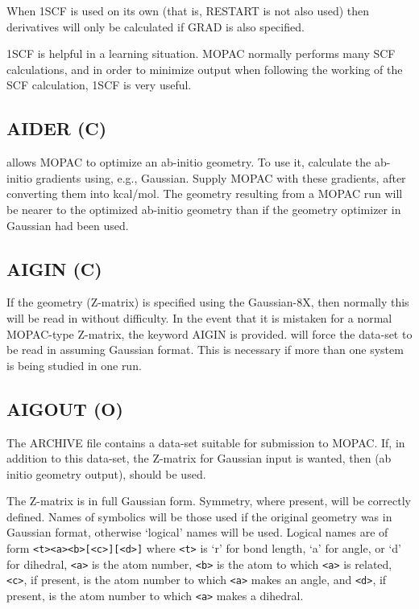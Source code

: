       When 1SCF is used on its own (that is, RESTART  is  not  also  used)
 then derivatives will only be calculated if GRAD is also specified.

      1SCF is helpful in a learning situation.   MOPAC  normally  performs
 many SCF calculations, and in order to minimize output when following the
 working of the SCF calculation, 1SCF is very useful.

\subsection*{AIDER (C)}
  allows MOPAC to optimize an ab-initio geometry.   To  use  it,
 calculate  the  ab-initio  gradients using, e.g., Gaussian.  Supply MOPAC
 with these gradients, after converting them into kcal/mol.  The  geometry
 resulting  from  a  MOPAC  run  will be nearer to the optimized ab-initio
 geometry than if the geometry optimizer in Gaussian had been used.
 
 
\subsection*{AIGIN (C)}
      If the geometry (Z-matrix) is specified using the Gaussian-8X,  then
 normally  this  will be read in without difficulty.  In the event that it
 is mistaken for a  normal  MOPAC-type  Z-matrix,  the  keyword  AIGIN  is
 provided.  will force the data-set to be read in assuming Gaussian
 format.  This is necessary if more than one system is  being  studied  in
 one run.

\subsection*{AIGOUT (O)}
     The ARCHIVE file contains a  data-set  suitable  for  submission  to
MOPAC.  If, in addition to this data-set, the Z-matrix for Gaussian input
is wanted, then  (ab initio geometry output), should be used.

     The Z-matrix is in full Gaussian  form.   Symmetry,  where  present,
will  be correctly defined.  Names of symbolics will be those used if the
original geometry was in Gaussian format, otherwise `logical' names  will
be  used.  Logical names are of form \verb/<t><a><b>[<c>][<d>]/ 
where \verb/<t>/ is `r'
for bond length, `a' for angle, or `d' for  dihedral, \verb/<a>/ is the atom
number, \verb/<b>/ is the atom to which \verb/<a>/ is related, \verb/<c>/, 
if present, is the atom number to which \verb/<a>/ makes an angle, 
and \verb/<d>/, if present, is the atom
number to which \verb/<a>/ makes a dihedral.

